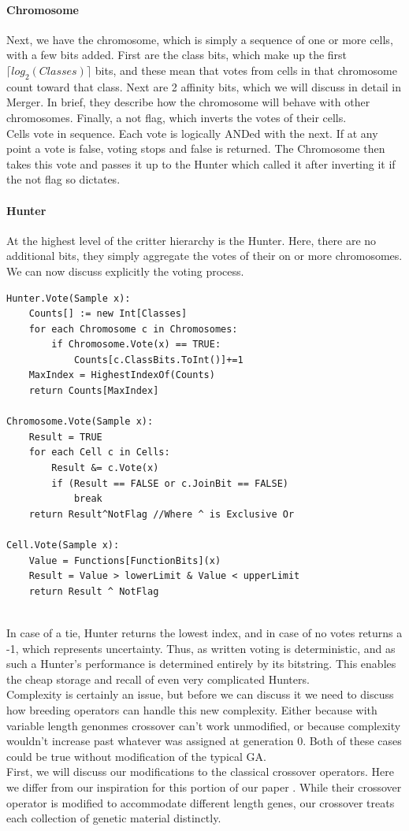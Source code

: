 \paragraph{Chromosome}
Next, we have the chromosome, which is simply a sequence of one or more cells, with a few bits added.  First are the class bits, which make up the first $\lceil log_2(Classes)\rceil$ bits, and these mean that votes from cells in that chromosome count toward that class.  Next are 2 affinity bits, which we will discuss in detail in Merger.  In brief, they describe how the chromosome will behave with other chromosomes.  Finally, a not flag, which inverts the votes of their cells.\\
Cells vote in sequence.  Each vote is logically ANDed with the next.  If at any point a vote is false, voting stops and false is returned.  The Chromosome then takes this vote and passes it up to the Hunter which called it after inverting it if the not flag so dictates.
\paragraph{Hunter}
At the highest level of the critter hierarchy is the Hunter.  Here, there are no additional bits, they simply aggregate the votes of their on or more chromosomes.  We can now discuss explicitly the voting process.  
\begin{lstlisting}[language = algorithm, caption={Purist Voting Algorithms}, label = {fig:vote}]
Hunter.Vote(Sample x):
	Counts[] := new Int[Classes]
	for each Chromosome c in Chromosomes:
		if Chromosome.Vote(x) == TRUE:
			Counts[c.ClassBits.ToInt()]+=1
	MaxIndex = HighestIndexOf(Counts)
	return Counts[MaxIndex]
	
Chromosome.Vote(Sample x):
	Result = TRUE
	for each Cell c in Cells:
		Result &= c.Vote(x)
		if (Result == FALSE or c.JoinBit == FALSE) 
			break
	return Result^NotFlag //Where ^ is Exclusive Or
	
Cell.Vote(Sample x):
	Value = Functions[FunctionBits](x)
	Result = Value > lowerLimit & Value < upperLimit
	return Result ^ NotFlag
	 
\end{lstlisting}
In case of a tie, Hunter returns the lowest index, and in case of no votes returns a -1, which represents uncertainty.  Thus, as written voting is deterministic, and as such a Hunter's performance is determined entirely by its bitstring.  This enables the cheap storage and recall of even very complicated Hunters.\\
Complexity is certainly an issue, but before we can discuss it we need to discuss how breeding operators can handle this new complexity.  Either because with variable length genonmes crossover can't work unmodified, or because complexity wouldn't increase past whatever was assigned at generation 0.  Both of these cases could be true without modification of the typical GA.\\
First, we will discuss our modifications to the classical crossover operators.  Here we differ from our inspiration for this portion of our paper \citep{kharma_project_2004}.  While their crossover operator is modified to accommodate different length genes, our crossover treats each collection of genetic material distinctly.\\

